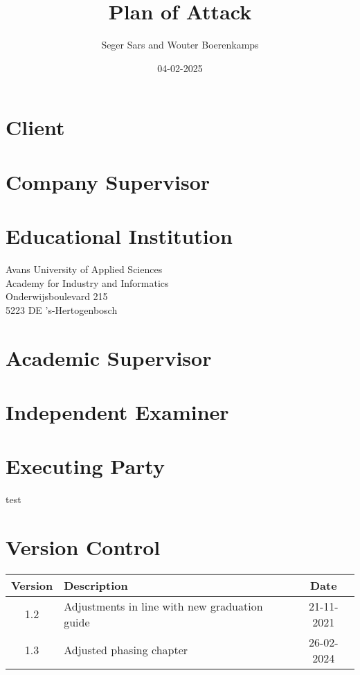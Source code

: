 \documentclass{article}
\title{Plan of Attack}
\author{Seger Sars and Wouter Boerenkamps}
\date{04-02-2025}
\begin{document}
\maketitle

\newpage

\section*{Client}

\section*{Company Supervisor}

\section*{Educational Institution}
Avans University of Applied Sciences \\
Academy for Industry and Informatics \\
Onderwijsboulevard 215 \\
5223 DE 's-Hertogenbosch

\section*{Academic Supervisor}

\section*{Independent Examiner}

\section*{Executing Party}
test
\newpage

\section*{Version Control}

\begin{tabular}{|c|l|c|}
    \hline
    Version & Description & Date \\
    \hline
    1.2 & Adjustments in line with new graduation guide & 21-11-2021 \\
    1.3 & Adjusted phasing chapter & 26-02-2024 \\
    \hline
\end{tabular}
\end{document}
